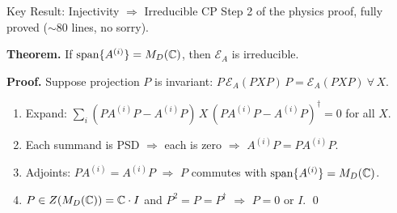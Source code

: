 \documentclass[aspectratio=169,10pt]{beamer}
\begin{document}
\begin{frame}{Key Result: Injectivity $\Rightarrow$ Irreducible CP\quad\textcolor{leangreen}{\checkmark}}
    \vspace{-0.3em}
    {\small Step 2 of the physics proof, fully proved ($\sim$80 lines, no sorry).}

    \vspace{0.3em}
    \textbf{Theorem.}  If $\mathrm{span}\{A^{(i)}\} = M_D(\mathbb{C})$, then $\mathcal{E}_A$ is irreducible.

    \vspace{0.3em}
    \textbf{Proof.}  Suppose projection $P$ is invariant: $P\,\mathcal{E}_A(PXP)\,P = \mathcal{E}_A(PXP)\ \forall\, X$.
    \begin{enumerate}\itemsep0.15em
        \item {\small Expand: $\sum_i (PA^{(i)}P - A^{(i)}P)\,X\,(PA^{(i)}P - A^{(i)}P)^\dagger = 0$ for all $X$.}
        \item {\small Each summand is PSD $\Rightarrow$ each is zero $\Rightarrow$ $A^{(i)}P = PA^{(i)}P$.}
        \item {\small Adjoints: $PA^{(i)} = A^{(i)}P$ $\Rightarrow$ $P$ commutes with $\mathrm{span}\{A^{(i)}\} = M_D(\mathbb{C})$.}
        \item {\small $P \in Z(M_D(\mathbb{C})) = \mathbb{C}\cdot I$ and $P^2 = P = P^\dagger$ $\Rightarrow$ $P = 0$ or $I$. \qed}
    \end{enumerate}
\end{frame}
\end{document}
